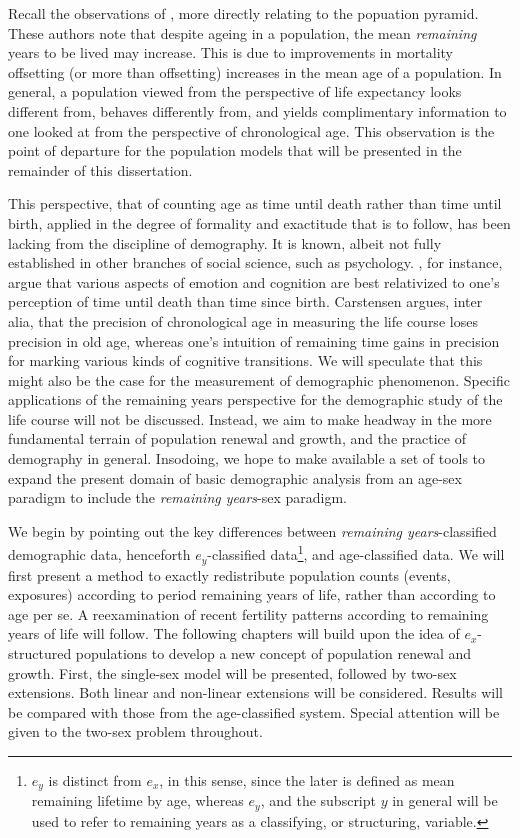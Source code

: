  \FloatBarrier
Recall the observations of \citet{sanderson2005average}, more directly
relating to the popuation pyramid. These authors note that despite ageing in a
population, the mean \textit{remaining} years to be lived may increase. This is due 
to improvements in mortality offsetting (or more than offsetting) increases in
the mean age of a population. In general, a population viewed from the
perspective of life expectancy looks different from, behaves differently from,
and yields complimentary information to one looked at from the
perspective of chronological age. This observation is the point of departure for
the population models that will be presented in the remainder of this
dissertation.

This perspective, that of counting age as time until death rather than time
until birth, applied in the degree of formality and exactitude that is to
follow, has been lacking from the discipline of demography. It is known, albeit 
not fully established in other branches of social science, such as psychology.
\citet{carstensen2006influence,carstensen1999taking}, for instance, argue that
various aspects of emotion and cognition are best relativized to one's perception of time until
death than time since birth. Carstensen argues, inter alia, that the precision
of chronological age in measuring the life course loses precision in old age,
whereas one's intuition of remaining time gains in precision for marking various
kinds of cognitive transitions. We will speculate that this might also be
the case for the measurement of demographic phenomenon. Specific applications of
the remaining years perspective for the demographic study of the life course
will not be discussed. Instead, we aim to make headway in the more fundamental terrain of
population renewal and growth, and the practice of demography in general.
Insodoing, we hope to make available a set of tools to expand the present domain
of basic demographic analysis from an age-sex paradigm to include the
\textit{remaining years}-sex paradigm.

We begin by pointing out the key differences
between \textit{remaining years}-classified demographic data,
henceforth $e_y$-classified data\footnote{$e_y$ is distinct from $e_x$, in
this sense, since the later is defined as mean remaining lifetime by age,
whereas $e_y$, and the subscript $y$ in general will be used to refer to
remaining years as a classifying, or structuring, variable.}, and age-classified
data. We will first present a method to exactly redistribute population counts (events, exposures) according to period remaining years of life, rather than according to age per se. A reexamination of recent fertility patterns according to remaining years of life will follow. The following chapters will build upon the idea of $e_x$-structured populations
to develop a new concept of population renewal and growth. First, the single-sex
model will be presented, followed by two-sex extensions. Both linear and
non-linear extensions will be considered. Results will be compared with those
from the age-classified system. Special attention will be given to the two-sex
problem throughout.


